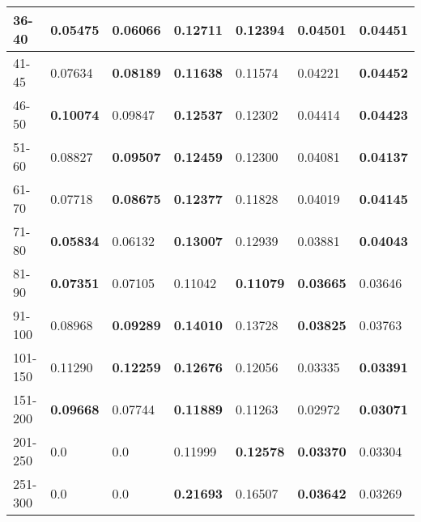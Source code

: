 \begin{table*}[h!]
\begin{tabular}{|l|l|l||l|l||l|l|}
        36-40    & 0.05475                                 & \textbf{0.06066}               & \textbf{0.12711}                 & 0.12394          & \textbf{0.04501} & 0.04451          \\ \hline
        41-45    & 0.07634                                 & \textbf{0.08189}               & \textbf{0.11638}                 & 0.11574          & 0.04221          & \textbf{0.04452} \\ \hline
        46-50    & \textbf{0.10074}                        & 0.09847                        & \textbf{0.12537}                 & 0.12302          & 0.04414          & \textbf{0.04423} \\ \hline
        51-60    & 0.08827                                 & \textbf{0.09507}               & \textbf{0.12459}                 & 0.12300          & 0.04081          & \textbf{0.04137} \\ \hline
        61-70    & 0.07718                                 & \textbf{0.08675}               & \textbf{0.12377}                 & 0.11828          & 0.04019          & \textbf{0.04145} \\ \hline
        71-80    & \textbf{0.05834}                        & 0.06132                        & \textbf{0.13007}                 & 0.12939          & 0.03881          & \textbf{0.04043} \\ \hline
        81-90    & \textbf{0.07351}                        & 0.07105                        & 0.11042                          & \textbf{0.11079} & \textbf{0.03665} & 0.03646          \\ \hline
        91-100   & 0.08968                                 & \textbf{0.09289}               & \textbf{0.14010}                 & 0.13728          & \textbf{0.03825} & 0.03763          \\ \hline
        101-150  & 0.11290                                 & \textbf{0.12259}               & \textbf{0.12676}                 & 0.12056          & 0.03335          & \textbf{0.03391} \\ \hline
        151-200  & \textbf{0.09668}                        & 0.07744                        & \textbf{0.11889}                 & 0.11263          & 0.02972          & \textbf{0.03071} \\ \hline
        201-250  & 0.0                                     & 0.0                            & 0.11999                          & \textbf{0.12578} & \textbf{0.03370} & 0.03304          \\ \hline
        251-300  & 0.0                                     & 0.0                            & \textbf{0.21693}                 & 0.16507          & \textbf{0.03642} & 0.03269          \\ \hline

\end{tabular}
\end{table*}
